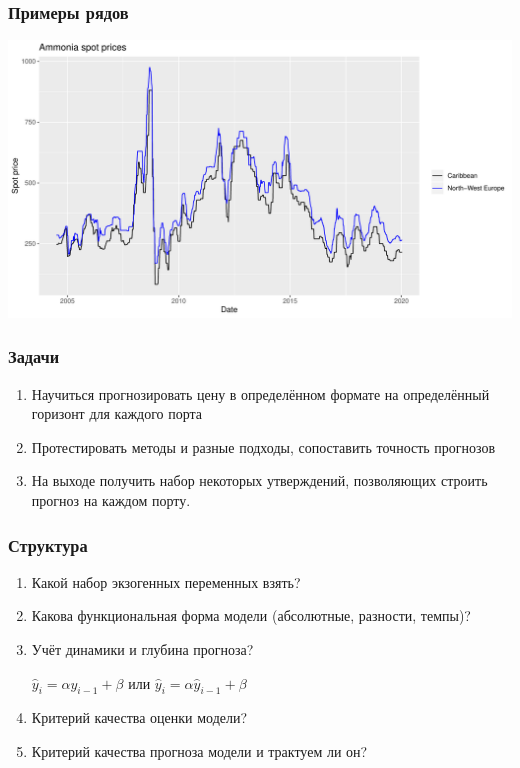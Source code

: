 \begin{frame}
\frametitle{Примеры рядов}

\begin{center}
\includegraphics[width = \linewidth]{slides/series.pdf}
\end{center}
\end{frame}

\begin{frame}
\frametitle{Задачи}

\begin{enumerate}[\Sun]
\item Научиться прогнозировать цену в определённом формате на определённый горизонт для каждого порта
\item Протестировать методы и разные подходы, сопоставить точность прогнозов
\item На выходе получить набор некоторых утверждений, позволяющих строить прогноз на каждом порту.
\end{enumerate}
\end{frame}

\begin{frame}
\frametitle{Структура}
\begin{enumerate}
	\item Какой набор экзогенных переменных взять?
	
	\item Какова функциональная форма модели (абсолютные, разности, темпы)?
	
	\item Учёт динамики и глубина прогноза?
	
	$ \hat{y}_i = \alpha y_{i-1} + \beta $ или $ \hat{y}_i = \alpha \hat{y}_{i-1} + \beta $
	
	\item Критерий качества оценки модели?
	
	\item Критерий качества прогноза модели и трактуем ли он?
	
\end{enumerate}
\end{frame}


